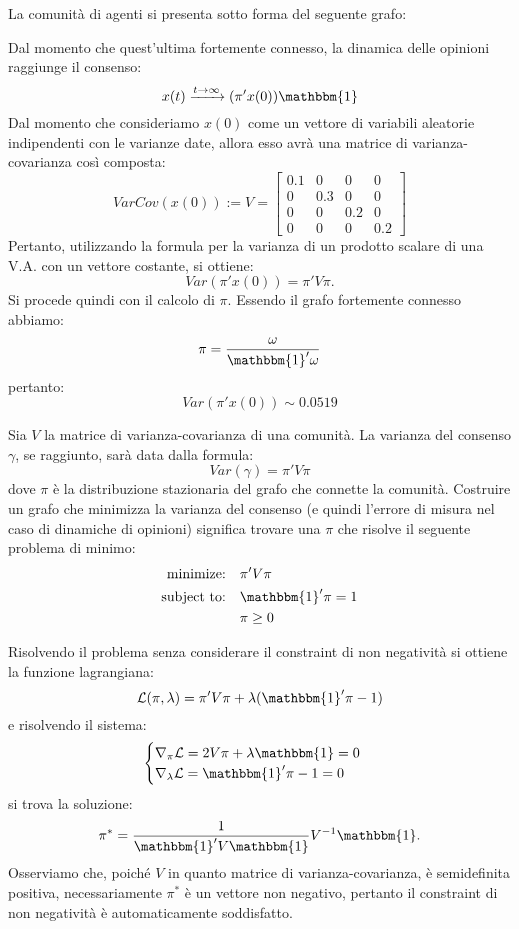 
\begin{alphaparts}
    \questionpart %
    La comunità di agenti si presenta sotto forma del seguente grafo:
    
    Dal momento che quest'ultima fortemente connesso, la dinamica delle opinioni raggiunge il consenso:
    \[x(t) \xrightarrow[]{t\to \infty}(\pi'x(0))\mathbbm{1}\]
    Dal momento che consideriamo \(x(0)\) come un vettore di variabili aleatorie indipendenti con le varianze date, allora esso avrà una matrice di varianza-covarianza così composta:
    \[VarCov(x(0)):= V= \begin{bmatrix}
        0.1 & 0 & 0 & 0 \\
        0 & 0.3 & 0 & 0\\
        0 & 0 & 0.2 & 0\\
        0 & 0 & 0 & 0.2
    \end{bmatrix}\]
    Pertanto, utilizzando la formula per la varianza di un prodotto scalare di una V.A. con un vettore costante, si ottiene:
    \[Var(\pi'x(0)) = \pi' V \pi.\]
    Si procede quindi con il calcolo di \(\pi\). Essendo il grafo fortemente connesso abbiamo:
    \[\pi = \frac{\omega}{\mathbbm{1}'\omega}\]
    pertanto:
    \[Var(\pi'x(0)) \sim 0.0519\]

    \questionpart %
    Sia \(V\) la matrice di varianza-covarianza di una comunità. La varianza del consenso \(\gamma\), se raggiunto, sarà data dalla formula:
    \[Var(\gamma) = \pi' V \pi\]
    dove \(\pi\) è la distribuzione stazionaria del grafo che connette la comunità. Costruire un grafo che minimizza la varianza del consenso (e quindi l'errore di misura nel caso di dinamiche di opinioni) significa trovare una \(\pi\) che risolve il seguente problema di minimo:
    \begin{align*}
        \text{minimize:} \quad & \pi'V\pi \\
        \text{subject to:} \quad &\mathbbm{1}'\pi = 1 \\
        & \pi \geq  0
    \end{align*}

    Risolvendo il problema senza considerare il constraint di non negatività si ottiene la funzione lagrangiana:
    \[\mathcal{L}(\pi, \lambda) = \pi'V\pi + \lambda(\mathbbm{1}'\pi- 1)\]
    e risolvendo il sistema:
    \begin{equation*}
        \begin{cases} \nabla_{\pi} \mathcal{L} = 2V\pi + \lambda \mathbbm{1} = 0 \\
        \nabla_{\lambda} \mathcal{L} = \mathbbm{1}'\pi- 1 = 0\end{cases} 
    \end{equation*}
    si trova la soluzione:
    \begin{equation}
        \pi^* = \frac{1}{\mathbbm{1}'V\mathbbm{1}} V^{- 1} \mathbbm{1}.
    \end{equation}
    Osserviamo che, poiché \(V\) in quanto matrice di varianza-covarianza, è semidefinita positiva, necessariamente \(\pi^*\) è un vettore non negativo, pertanto il constraint di non negatività è automaticamente soddisfatto.
\end{alphaparts}
